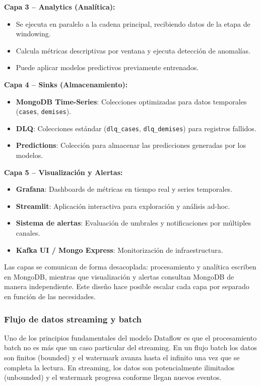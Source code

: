 \documentclass[12pt,a4paper]{article}
\begin{document}
\textbf{Capa 3 -- Analytics (Analítica):}
\begin{itemize}
    \item Se ejecuta en paralelo a la cadena principal, recibiendo datos de la etapa de windowing.
    \item Calcula métricas descriptivas por ventana y ejecuta detección de anomalías.
    \item Puede aplicar modelos predictivos previamente entrenados.
\end{itemize}

\textbf{Capa 4 -- Sinks (Almacenamiento):}
\begin{itemize}
    \item \textbf{MongoDB Time-Series}: Colecciones optimizadas para datos temporales (\texttt{cases}, \texttt{demises}).
    \item \textbf{DLQ}: Colecciones estándar (\texttt{dlq\_cases}, \texttt{dlq\_demises}) para registros fallidos.
    \item \textbf{Predictions}: Colección para almacenar las predicciones generadas por los modelos.
\end{itemize}

\textbf{Capa 5 -- Visualización y Alertas:}
\begin{itemize}
    \item \textbf{Grafana}: Dashboards de métricas en tiempo real y series temporales.
    \item \textbf{Streamlit}: Aplicación interactiva para exploración y análisis ad-hoc.
    \item \textbf{Sistema de alertas}: Evaluación de umbrales y notificaciones por múltiples canales.
    \item \textbf{Kafka UI / Mongo Express}: Monitorización de infraestructura.
\end{itemize}

Las capas se comunican de forma desacoplada: procesamiento y analítica escriben en MongoDB, mientras que visualización y alertas consultan MongoDB de manera independiente. Este diseño hace posible escalar cada capa por separado en función de las necesidades.

\subsubsection{Flujo de datos streaming y batch}\label{flujo-de-datos-streaming-y-batch}
Uno de los principios fundamentales del modelo Dataflow es que el procesamiento batch no es más que un caso particular del streaming. En un flujo batch los datos son finitos (bounded) y el watermark avanza hasta el infinito una vez que se completa la lectura. En streaming, los datos son potencialmente ilimitados (unbounded) y el watermark progresa conforme llegan nuevos eventos.
\end{document}
